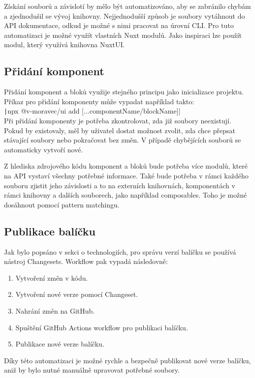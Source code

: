 Získání souborů a závislotí by mělo být automatizováno, aby se zabránilo chybám a zjednodušil se vývoj knihovny. Nejjednodušší způsob je soubory vytáhnout do API dokumentace, odkud je možné s nimi pracovat na úrovní CLI. Pro tuto automatizaci je možné využít vlastních Nuxt modulů. Jako inspiraci lze použít modul, který využívá knihovna NuxtUI. \cite{NuxtUISourceCodeModule}

\subsection{Přidání komponent}
Přidání komponent a bloků využije stejného principu jako inicializace projektu. Příkaz pro přidání komponenty může vypadat například takto:\\

\texttt|npx @v-moravec/ui add [...componentName/blockName]|\\

Při přidání komponenty je potřeba zkontrolovat, zda již soubory neexistují. Pokud by existovaly, měl by uživatel dostat možnost zvolit, zda chce přepsat stávající soubory nebo pokračovat bez změn. V případě chybějících souborů se automaticky vytvoří nové.

Z hlediska zdrojového kódu komponent a bloků bude potřeba více modulů, které na API vystaví všechny potřebné informace. Také bude potřeba v rámci každého souboru zjistit jeho závislosti a to na externích knihovnách, komponentách v rámci knihovny a dalších souborech, jako například composables. Toho je možné dosáhnout pomocí pattern matchingu.

\subsection{Publikace balíčku}
Jak bylo popsáno v sekci o technologiích, pro správu verzí balíčku se používá nástroj Changesets. Workflow pak vypadá následovně:

\begin{enumerate}
  \item Vytvoření změn v kódu.
  \item Vytvoření nové verze pomocí Changeset.
  \item Nahrání změn na GitHub.
  \item Spuštění GitHub Actions workflow pro publikaci balíčku.
  \item Publikace nové verze balíčku.
\end{enumerate}

Díky této automatizaci je možné rychle a bezpečně publikovat nové verze balíčku, aniž by bylo nutné manuálně upravovat potřebné soubory.

